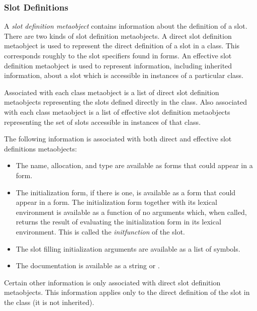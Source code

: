\subsubsection{Slot Definitions}

A \emph{slot definition metaobject} contains information about the definition of a
slot. There are two kinds of slot definition metaobjects. A direct slot
definition metaobject is used to represent the direct definition of a slot in a
class. This corresponds roughly to the slot specifiers found in 
forms. An effective slot definition metaobject is used to represent information,
including inherited information, about a slot which is accessible in instances
of a particular class. 

Associated with each class metaobject is a list of direct slot definition
metaobjects representing the slots defined directly in the class. Also
associated with each class metaobject is a list of effective slot definition
metaobjects representing the set of slots accessible in instances of that
class. 

The following information is associated with both direct and effective slot
definitions metaobjects: 


  \begin{itemize}
  \item 
    The name, allocation, and type are available as forms that could appear in a
     form.

  \item 
    The initialization form, if there is one, is available as a form that could
    appear in a  form. The initialization form together with its lexical
    environment is available as a function of no arguments which, when called,
    returns the result of evaluating the initialization form in its lexical
    environment. This is called the \emph{initfunction} of the slot.

  \item 
    The slot filling initialization arguments are available as a list of
    symbols. 

  \item 
    The documentation is available as a string or .

  \end{itemize}


Certain other information is only associated with direct slot definition
metaobjects. This information applies only to the direct definition of the slot
in the class (it is not inherited). 


